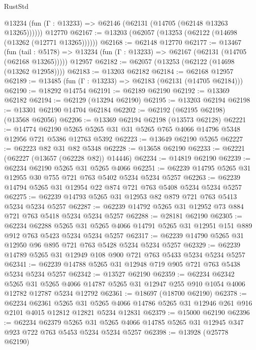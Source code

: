 \begin{lexlean}{RustStd}
\begin{coremodule}
      @13234 (fun (Γ : @13233) => @62146 (@62131 (@14705 (@62148 @13263 @13265))))))
    @12770
@62167 := @13203 (@62057 (@13253 (@62122 (@14698 (@13262 (@12771 @13265))))))
@62168 := @62148 @12770
@62177 := @13467
    (fun (tail : @5178) => @13234 (fun (Γ : @13233) => @62167 (@62131 (@14705 (@62168 @13265)))))
    @12957
@62182 := @62057 (@13253 (@62122 (@14698 (@13262 @12958))))
@62183 := @13203 @62182
@62184 := @62168 @12957
@62189 := @13485 (fun (Γ : @13233) => @62183 (@62131 (@14705 @62184)))
@62190 := @18292 @14754
@62191 := @62189 @62190
@62192 := @13369 @62182
@62194 := @62129 (@13294 @62190)
@62195 := @13203 @62194
@62198 := @13301 @62190 @14704 @62184
@62202 := @62192 (@62195 @62198) (@13568 @62056)
@62206 := @13369 @62194 @62198 (@13573 @62128)
@62221 := @14774
    @62190
    @5265
    @5265
    @31
    @31
    @5265
    @765
    @4066
    @14796
    @5348
    @12956
    @721
    @5386
    @12763
    @5392
@62223 := @13649 @62190 @5265
@62227 := @62223 @82 @31 @82 @5348
@62228 := @13658 @62190
@62233 := @62221 (@62227 (@13657 (@62228 @82)) @14446)
@62234 := @14819 @62190
@62239 := @62234 @62190 @5265 @31 @5265 @4066
@62251 := @62239 @14795 @5265 @31 @12955 @30 @755 @721 @763 @5402 @5234 @5234 @5257
@62263 := @62239 @14794 @5265 @31 @12954 @22 @874 @721 @763 @5408 @5234 @5234 @5257
@62275 := @62239 @14793 @5265 @31 @12953 @82 @879 @721 @763 @5413 @5234 @5234 @5257
@62287 := @62239 @14792 @5265 @31 @12952 @73 @884 @721 @763 @5418 @5234 @5234 @5257
@62288 := @28181 @62190
@62305 := @62234
    @62288
    @5265
    @31
    @5265
    @4066
    @14791
    @5265
    @31
    @12951
    @151
    @889
    @912
    @763
    @5423
    @5234
    @5234
    @5257
@62317 := @62239 @14790 @5265 @31 @12950 @96 @895 @721 @763 @5428 @5234 @5234 @5257
@62329 := @62239 @14789 @5265 @31 @12949 @108 @900 @721 @763 @5433 @5234 @5234 @5257
@62341 := @62239 @14788 @5265 @31 @12948 @719 @905 @721 @763 @5438 @5234 @5234 @5257
@62342 := @13527 @62190
@62359 := @62234
    @62342
    @5265
    @31
    @5265
    @4066
    @14787
    @5265
    @31
    @12947
    @255
    @910
    @1054
    @4006
    @12782
    @12787
    @5234
    @12792
@62361 := @18697 (@18700 @62190)
@62378 := @62234
    @62361
    @5265
    @31
    @5265
    @4066
    @14786
    @5265
    @31
    @12946
    @261
    @916
    @2101
    @4015
    @12812
    @12821
    @5234
    @12831
@62379 := @15000 @62190
@62396 := @62234
    @62379
    @5265
    @31
    @5265
    @4066
    @14785
    @5265
    @31
    @12945
    @347
    @923
    @722
    @763
    @5453
    @5234
    @5234
    @5257
@62398 := @13928 (@25778 @62190)

\end{coremodule}
\end{lexlean}
